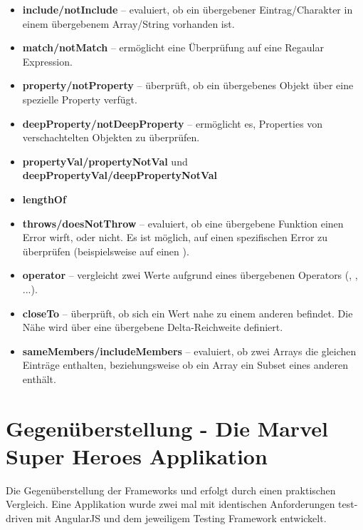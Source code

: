 \begin{itemize}
  \item \textbf{include/notInclude} -- evaluiert, ob ein übergebener Eintrag/Charakter in einem übergebenem Array/String vorhanden ist.
  
  \item \textbf{match/notMatch} -- ermöglicht eine Überprüfung auf eine Regaular Expression.
  
  \item \textbf{property/notProperty} -- überprüft, ob ein übergebenes Objekt über eine spezielle Property verfügt.
  
  \item \textbf{deepProperty/notDeepProperty} -- ermöglicht es, Properties von verschachtelten Objekten zu überprüfen.
  
  \item \textbf{propertyVal/propertyNotVal} und \textbf{deepPropertyVal/deepPropertyNotVal}
  
  \item \textbf{lengthOf}
  
  \item \textbf{throws/doesNotThrow} -- evaluiert, ob eine übergebene Funktion einen Error wirft, oder nicht. Es ist möglich, auf einen spezifischen Error zu überprüfen (beispielsweise auf einen ).
  
  \item \textbf{operator} -- vergleicht zwei Werte aufgrund eines übergebenen Operators (\glqq{<\grqq}, \glqq{>\grqq}, ...).
  
  \item \textbf{closeTo} -- überprüft, ob sich ein Wert nahe zu einem anderen befindet. Die Nähe wird über eine übergebene Delta-Reichweite definiert.
  
  \item \textbf{sameMembers/includeMembers} -- evaluiert, ob zwei Arrays die gleichen Einträge enthalten, beziehungsweise ob ein Array ein Subset eines anderen enthält.
  
\end{itemize}

\newpage
\section{Gegenüberstellung - Die Marvel Super Heroes Applikation}
\label{Gegenüberstellung}
 Die Gegenüberstellung der Frameworks  und  erfolgt durch einen praktischen Vergleich. Eine Applikation wurde zwei mal mit identischen Anforderungen test-driven mit AngularJS und dem jeweiligem Testing Framework entwickelt.

